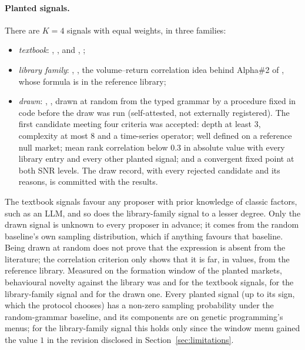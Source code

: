 \paragraph{Planted signals.} There are $K=4$ signals with equal weights, in
three families:
\begin{itemize}
  \item \emph{textbook}: , ,
    and , ;
  \item \emph{library family}: ,
    , the volume--return
    correlation idea behind Alpha\#2 of \citet{kakushadze2016alphas}, whose
    formula is in the reference library;
  \item \emph{drawn}: \code{\SynDrawnName}, \SynDrawnExpression{}, drawn at
    random from the typed grammar by a procedure fixed in code before the
    draw was run (self-attested, not externally registered). The
    first candidate meeting four criteria was accepted: depth at least 3,
    complexity at most 8 and a time-series operator; well defined on a
    reference null market; mean rank correlation below $0.3$ in absolute
    value with every library entry and every other planted signal; and a
    convergent fixed point at both SNR levels. The draw record, with every
    rejected candidate and its reasons, is committed with the results.
\end{itemize}
The textbook signals favour any proposer with prior knowledge of classic
factors, such as an LLM, and so does the library-family signal to a lesser
degree. Only the drawn signal is unknown to every proposer in advance; it
comes from the random baseline's own sampling distribution, which if anything
favours that baseline. Being drawn at random does not prove that the
expression is absent from the literature; the correlation criterion only
shows that it is far, in values, from the reference library. Measured on the
formation window of the planted markets, behavioural novelty against the
library was \SynNoveltyReversal{} and \SynNoveltyVolume{} for the textbook
signals, \SynNoveltyLibraryFamily{} for the library-family signal and
\SynNoveltyDrawn{} for the drawn one. Every planted signal (up to its sign,
which the protocol chooses) has a non-zero sampling probability under the
random-grammar baseline, and its components are on genetic programming's
menus; for the library-family signal this holds only since the window menu
gained the value $1$ in the revision disclosed in
Section~\ref{sec:limitations}.

